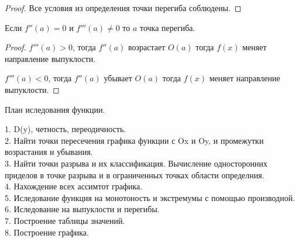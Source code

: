\begin{proof}
  Все условия из определения точки перегиба соблюдены.
\end{proof}

\begin{theorem}
  Если $f''(a) = 0$ и $f'''(a) \not= 0$ то $a$ точка перегиба.
\end{theorem}

\begin{proof}
  $f'''(a) > 0$, тогда $f''(a)$ возрастает $O(a)$ тогда $f(x)$ меняет
  направление выпуклости.

  $f'''(a) < 0$, тогда $f''(a)$ убывает $O(a)$ тогда $f(x)$ меняет направление
  выпуклости.
\end{proof}

\begin{title}[\Large]
  План иследования функции.
\end{title}
1. D(y), четность, переодичность.\\
2. Найти точки пересечения графика функции с Ox и Oy, и промежутки возрастания
  и убывания.\\
3. Найти точки разрыва и их классификация. Вычисление односторонних приделов
  в точке разрыва и в ограниченных точках области определния.\\
4. Нахождение всех ассимтот графика.\\
5. Иследование функция на монотоность и экстремумы с помощью производной.\\
6. Иследование на выпуклости и перегибы.\\
7. Построение таблицы значений.\\
8. Построение графика.\\